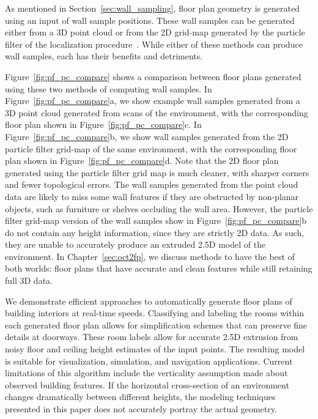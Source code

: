 \documentclass[12pt,onecolumn,oneside]{book}
\begin{document}
As mentioned in Section~\ref{sec:wall_sampling}, floor plan geometry is generated using an input of wall sample positions.  These wall samples can be generated either from a 3D point cloud or from the 2D grid-map generated by the particle filter of the localization procedure~\cite{NickJournal}.  While either of these methods can produce wall samples, each has their benefits and detriments.

Figure~\ref{fig:pf_pc_compare} shows a comparison between floor plans generated using these two methods of computing wall samples.  In Figure~\ref{fig:pf_pc_compare}a, we show example wall samples generated from a 3D point cloud generated from scans of the environment, with the corresponding floor plan shown in Figure~\ref{fig:pf_pc_compare}c.  In Figure~\ref{fig:pf_pc_compare}b, we show wall samples generated from the 2D particle filter grid-map of the same environment, with the corresponding floor plan shown in Figure~\ref{fig:pf_pc_compare}d.  Note that the 2D floor plan generated using the particle filter grid map is much cleaner, with sharper corners and fewer topological errors.  The wall samples generated from the point cloud data are likely to miss some wall features if they are obstructed by non-planar objects, such as furniture or shelves occluding the wall area.  However, the particle filter grid-map version of the wall samples show in Figure~\ref{fig:pf_pc_compare}b do not contain any height information, since they are strictly 2D data.  As such, they are unable to accurately produce an extruded 2.5D model of the environment.  In Chapter~\ref{sec:oct2fp}, we discuss methods to have the best of both worlds:  floor plans that have accurate and clean features while still retaining full 3D data.

We demonstrate efficient approaches to automatically generate floor plans of building interiors at real-time speeds.  Classifying and labeling the rooms within each generated floor plan allows for simplification schemes that can preserve fine details at doorways.  These room labels allow for accurate 2.5D extrusion from noisy floor and ceiling height estimates of the input points.  The resulting model is suitable for visualization, simulation, and navigation applications.  Current limitations of this algorithm include the verticality assumption made about observed building features.  If the horizontal cross-section of an environment changes dramatically between different heights, the modeling techniques presented in this paper does not accurately portray the actual geometry.
\end{document}
